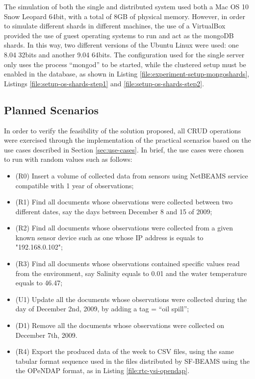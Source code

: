 The simulation of both the single and distributed system used both a Mac OS 10
Snow Leopard 64bit, with a total of 8GB of physical memory. However, in order
to simulate different shards in different machines, the use of a VirtualBox
\cite{virtualization} provided the use of guest operating systems to run and
act as the mongoDB shards. In this way, two different versions of the Ubuntu
Linux were used: one 8.04 32bits and another 9.04 64bits. The configuration
used for the single server only uses the process ``mongod'' to be started,
while the clustered setup must be enabled in the database, as shown in
Listing \ref{file:experiment-setup-mongoshards}, Listings
\ref{file:setup-os-shards-step1} and \ref{file:setup-os-shards-step2}.

\subsection{Planned Scenarios}
\label{sec:exp-scenarios}

In order to verify the feasibility of the solution proposed, all CRUD
operations were exercised through the implementation of the practical
scenarios based on the use cases described in Section \ref{sec:use-cases}. In
brief, the use cases were chosen to run with random values such as follows:

\begin{itemize}
  \item (R0) Insert a volume of collected data from sensors using NetBEAMS
  service compatible with 1 year of observations;
  \item (R1) Find all documents whose observations were collected between two
  different dates, say the days between December 8 and 15 of 2009;
  \item (R2) Find all documents whose observations were collected from a given
  known sensor device such as one whose IP address is equals to "192.168.0.102";
  \item (R3) Find all documents whose observations contained specific values
  read from the environment, say Salinity equals to 0.01 and the water temperature
  equals to 46.47;
  \item (U1) Update all the documents whose observations were collected during
  the day of December 2nd, 2009, by adding a tag = ``oil spill'';
  \item (D1) Remove all the documents whose observations were collected on
  December 7th, 2009.
  \item (R4) Export the produced data of the week to CSV files, using the same
  tabular format sequence used in the files distributed by SF-BEAMS using the 
  the OPeNDAP format, as in Listing \ref{file:rtc-ysi-opendap}.
\end{itemize}

